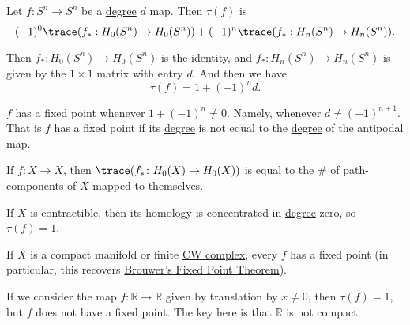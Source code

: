 \begin{eg}
	Let \(f \colon S^n \to S^n\) be a \hyperref[def:degree]{degree} \(d\) map. Then \(\tau(f)\) is
	\[
		(-1)^0\trace(f_\ast : H_0(S^n) \to H_0(S^n)) + (-1)^n\trace(f_\ast : H_n(S^n) \to H_n(S^n)).
	\]

	Then \(f_\ast \colon H_0(S^n) \to H_0(S^n)\) is the identity, and \(f_\ast \colon H_n(S^n) \to H_n(S^n)\) is given by the
	\(1 \times 1\) matrix with entry \(d\). And then we have
	\[
		\tau(f) = 1 + (-1)^n d.
	\]
\end{eg}

\begin{corollary}
	\(f\) has a fixed point whenever \(1 + (-1)^n \neq 0\). Namely, whenever \(d \neq (-1)^{n + 1}\). That is \(f\) has a fixed point if its
	\hyperref[def:degree]{degree} is not equal to the \hyperref[def:degree]{degree} of the antipodal map.
\end{corollary}

\begin{exercise}
	If \(f \colon X \to X\), then \(\trace(f_\ast \colon H_0(X) \to H_0(X))\) is equal to the \# of path-components of \(X\) mapped to themselves.
\end{exercise}

\begin{exercise}
	If \(X\) is contractible, then its homology is concentrated in \hyperref[def:degree]{degree} zero, so \(\tau(f) = 1\).

	If \(X\) is a compact manifold or finite \hyperref[def:CW-Complex]{CW complex}, every \(f\) has a fixed point (in particular,
	this recovers \hyperref[thm:Brouwer-fixed-point]{Brouwer's Fixed Point Theorem}).
\end{exercise}

\begin{eg}
	If we consider the map \(f \colon \mathbb{R} \to \mathbb{R}\) given by translation by \(x \neq 0\), then \(\tau(f) = 1\), but \(f\) does not have a fixed point.
	The key here is that \(\mathbb{R}\) is not compact.
\end{eg}

